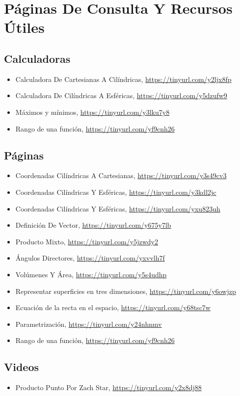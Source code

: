 \documentclass{article}
\begin{document}
\section{Páginas De Consulta Y Recursos Útiles}
\label{sec:org4b821b5}
\subsection{Calculadoras}
\label{sec:org271de3c}
\begin{itemize}
\item Calculadora De Cartesianas A Cilíndricas, \url{https://tinyurl.com/y2ljx8fp}
\item Calculadora De Cilíndricas A Esféricas, \url{https://tinyurl.com/y5dzufw9}
\item Máximos y mínimos, \url{https://tinyurl.com/y3lku7y8}
\item Rango de una función, \url{https://tinyurl.com/yf9cnh26}
\end{itemize}

\subsection{Páginas}
\label{sec:org510e6ed}
\begin{itemize}
\item Coordenadas Cilíndricas A Cartesianas, \url{https://tinyurl.com/y3s49cv3}
\item Coordenadas Cilíndricas Y Esféricas, \url{https://tinyurl.com/y3kdl2jc}
\item Coordenadas Cilíndricas Y Esféricas, \url{https://tinyurl.com/yxu823uh}
\item Definición De Vector, \url{https://tinyurl.com/y675y7lb}
\item Producto Mixto, \url{https://tinyurl.com/y5jzwdy2}
\item Ángulos Directores, \url{https://tinyurl.com/yxvvlh7f}
\item Volúmenes Y Área, \url{https://tinyurl.com/y5s4udhp}
\item Representar superficies en tres dimensiones, \url{https://tinyurl.com/y6owjzp}
\item Ecuación de la recta en el espacio, \url{https://tinyurl.com/y68tsc7w}
\item Parametrización, \url{https://tinyurl.com/y24nhnmv}
\item Rango de una función, \url{https://tinyurl.com/yf9cnh26}
\end{itemize}

\subsection{Videos}
\label{sec:orgf4e871f}
\begin{itemize}
\item Producto Punto Por Zach Star, \url{https://tinyurl.com/y2x8dj88}
\end{itemize}
\end{document}

